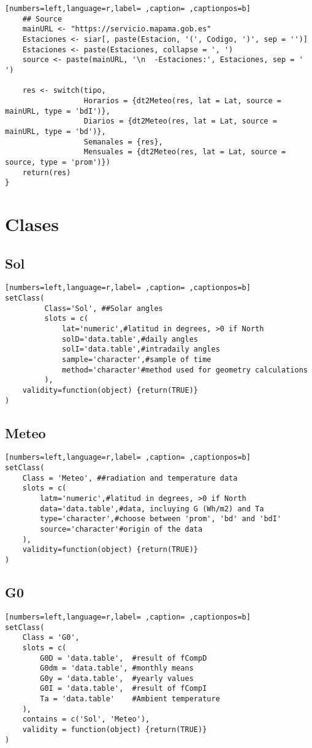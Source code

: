 \begin{lstlisting}[numbers=left,language=r,label= ,caption= ,captionpos=b]
    ## Source
    mainURL <- "https://servicio.mapama.gob.es"
    Estaciones <- siar[, paste(Estacion, '(', Codigo, ')', sep = '')]
    Estaciones <- paste(Estaciones, collapse = ', ')
    source <- paste(mainURL, '\n  -Estaciones:', Estaciones, sep = ' ')

    res <- switch(tipo,
                  Horarios = {dt2Meteo(res, lat = Lat, source = mainURL, type = 'bdI')},
                  Diarios = {dt2Meteo(res, lat = Lat, source = mainURL, type = 'bd')},
                  Semanales = {res},
                  Mensuales = {dt2Meteo(res, lat = Lat, source = source, type = 'prom')})
    return(res)
}
\end{lstlisting}

\section{Clases}
\label{sec:org4753fc3}
\subsection{Sol}
\label{sec:org5b0db8f}
\begin{lstlisting}[numbers=left,language=r,label= ,caption= ,captionpos=b]
setClass(
         Class='Sol', ##Solar angles
         slots = c(
             lat='numeric',#latitud in degrees, >0 if North
             solD='data.table',#daily angles
             solI='data.table',#intradaily angles
             sample='character',#sample of time
             method='character'#method used for geometry calculations
         ),
    validity=function(object) {return(TRUE)}
)
\end{lstlisting}
\subsection{Meteo}
\label{sec:orgc6a6f07}
\begin{lstlisting}[numbers=left,language=r,label= ,caption= ,captionpos=b]
setClass(
    Class = 'Meteo', ##radiation and temperature data
    slots = c(
        latm='numeric',#latitud in degrees, >0 if North
        data='data.table',#data, incluying G (Wh/m2) and Ta
        type='character',#choose between 'prom', 'bd' and 'bdI'
        source='character'#origin of the data
    ),
    validity=function(object) {return(TRUE)}
)
\end{lstlisting}
\subsection{G0}
\label{sec:org58c821c}
\begin{lstlisting}[numbers=left,language=r,label= ,caption= ,captionpos=b]
setClass(
    Class = 'G0',
    slots = c(
        G0D = 'data.table',  #result of fCompD
        G0dm = 'data.table', #monthly means
        G0y = 'data.table',  #yearly values
        G0I = 'data.table',  #result of fCompI
        Ta = 'data.table'    #Ambient temperature
    ),
    contains = c('Sol', 'Meteo'),
    validity = function(object) {return(TRUE)}
)

\end{lstlisting}
